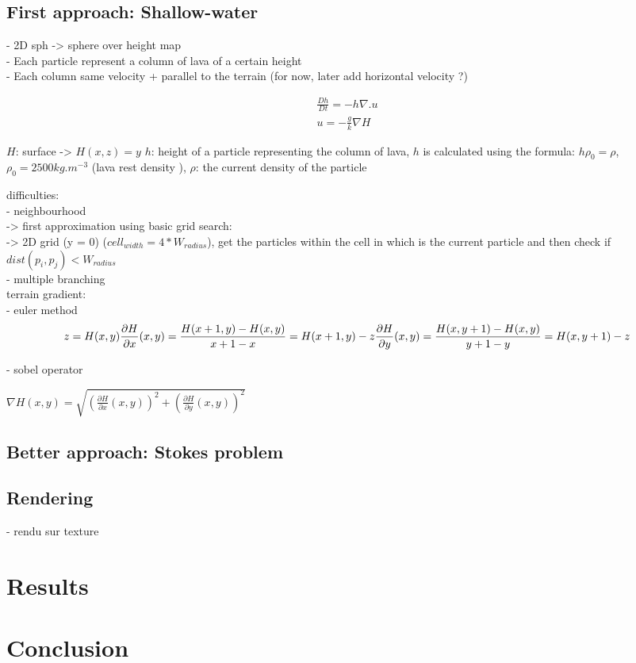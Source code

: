 \documentclass{article}
\begin{document}
\subsection*{First approach: Shallow-water}

- 2D sph -> sphere over height map\\
- Each particle represent a column of lava of a certain height\\
- Each column same velocity + parallel to the terrain (for now, later add horizontal velocity ?)

\begin{align}
    \frac{Dh}{Dt} = -h\nabla.u\\
    u = -\frac{g}{k}\nabla{H}
\end{align}

$H$: surface -> $H(x,z) = y$
$h$: height of a particle representing the column of lava, $h$ is calculated using the formula: 
$h \rho_0 = \rho$, $\rho_0 = 2500 kg.m^{-3}$ (lava rest density \cite{Griffiths}), $\rho$: the current density of the particle 

difficulties:\\
- neighbourhood\\
-> first approximation using basic grid search:\\
-> 2D grid (y = 0) (${cell}_{width} = 4*W_{radius}$), get the particles within the cell in which is the current particle and then check if $dist(p_i, p_j) < W_{radius}$\\
- multiple branching \cite{Chang2016ANS}\\

terrain gradient:\\
- euler method 
\[
    z = H(x,y)\\
   \frac{\partial H}{\partial x} (x,y) = \frac{H(x+1, y) - H(x,y)}{x+1-x} = H(x+1, y) - z\\
   \frac{\partial H}{\partial y} (x,y) = \frac{H(x, y+1) - H(x,y)}{y+1-y} = H(x, y+1) - z\\
\]

- sobel operator\cite{bogdan2019custom}

$\nabla H(x,y) = \sqrt{(\frac{\partial H}{\partial x} (x,y))^2 + (\frac{\partial H}{\partial y} (x,y))^2}$

\subsection*{Better approach: Stokes problem}

\subsection*{Rendering}

- rendu sur texture \\

\section*{Results}

\section*{Conclusion}

\nocite{*}



\appendix

%
\end{document}
